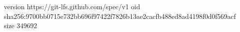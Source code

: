 version https://git-lfs.github.com/spec/v1
oid sha256:9700bb0715e732bb696f97422f7826b13ae2cacfb488ed8ad4198f0d0f569acf
size 349692
